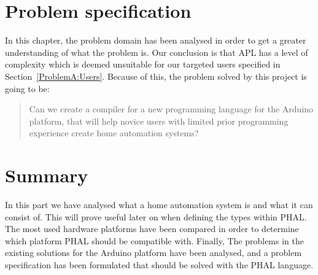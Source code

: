 \section{Problem specification}\label{sec:ProblemSpecification}
In this chapter, the problem domain has been analysed in order to get a greater understanding of what the problem is. Our conclusion is that APL has a level of complexity which is deemed unsuitable for our targeted users specified in Section~\ref{ProblemA:Users}. Because of this, the problem solved by this project is going to be:
\begin{quote}
Can we create a compiler for a new programming language for the Arduino platform, that will help novice users with limited prior programming experience create home automation systems?
\end{quote}

\section{Summary}
In this part we have analysed what a home automation system is and what it can consist of. This will prove useful later on when defining the types within PHAL. The most used hardware platforms have been compared in order to determine which platform PHAL should be compatible with. Finally, The problems in the existing solutions for the Arduino platform have been analysed, and a problem specification has been formulated that should be solved with the PHAL language.
